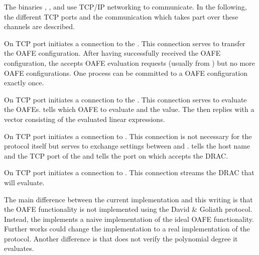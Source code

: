 %
%
\label{sec:communication-channels}

The binaries \JWBpOne{}, \JWBpTwo{}, and \JWBtoken{} use TCP/IP networking to
communicate. In the following, the different TCP ports and the communication
which takes part over these channels are described.



On TCP port  \JWpOne{} initiates a connection to the \JWtoken{}.
This connection serves to transfer the OAFE configuration. After having
successfully received the OAFE configuration, the \JWtoken{} accepts OAFE
evaluation requests (usually from \JWpTwo{}) but no more OAFE configurations.
One \JWtoken{} process can be committed to a OAFE configuration exactly once.



On TCP port  \JWpTwo{} initiates a connection to the \JWtoken{}.
This connection serves to evaluate the OAFEs. \JWpTwo{} tells which
OAFE to evaluate and the value. The \JWtoken{} then replies with a vector
consisting of the evaluated linear expressions.



On TCP port  \JWpTwo{} initiates a connection to \JWpOne{}. This
connection is not necessary for the protocol itself but serves to exchange
settings between \JWpOne{} and \JWpTwo{}. \JWpOne{} tells \JWpTwo{} the host
name and the TCP port of the \JWtoken{} and \JWpTwo{} tells \JWpOne{} the port
on which \JWpTwo{} accepts the DRAC.



On TCP port  \JWpOne{} initiates a connection to \JWpTwo{}. This
connection streams the DRAC that \JWpTwo{} will evaluate.


%
%
\label{sec:implementation-differences}

The main difference between the current implementation and this writing is that
the OAFE functionality is not implemented using the David \& Goliath
\cite{davidgoliath} protocol. Instead, the \JWBtoken{} implements a naive
implementation of the ideal OAFE functionality. Further works could change the
implementation to a real implementation of the protocol. Another difference is
that \JWpTwo{} does not verify the polynomial degree it evaluates.


